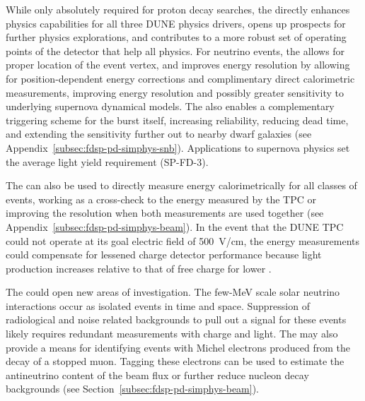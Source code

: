 While only absolutely required for proton decay searches, the  directly enhances physics capabilities for all three DUNE physics drivers, opens up prospects for further physics explorations, and contributes to a more robust set of operating points of the detector that help all physics.   For  neutrino events, the  allows for proper location of the event vertex, and improves energy resolution by allowing for position-dependent energy corrections and complimentary direct calorimetric measurements, 
improving energy resolution and possibly greater sensitivity to underlying supernova dynamical models.  The  also enables a complementary triggering scheme for the burst itself, increasing 
reliability, reducing dead time, and extending the sensitivity further out to nearby dwarf galaxies (see Appendix~\ref{subsec:fdsp-pd-simphys-snb}). Applications to supernova physics set the average light yield requirement (SP-FD-3).


The  can also be used to directly measure energy calorimetrically for all classes of events, working as a cross-check to the energy measured by the TPC or improving the resolution when both measurements are used together (see Appendix~\ref{subsec:fdsp-pd-simphys-beam}).  In the event that the DUNE TPC could not operate at its goal electric field of \SI{500}{V/cm}, the  energy measurements could compensate for lessened charge detector performance because light production increases relative to that of free charge for lower \efield{}.

The  could open new areas of investigation.  The few-MeV scale solar neutrino interactions occur as isolated events in time and space.  Suppression of radiological and noise related backgrounds to pull out a signal for these events likely requires  redundant measurements with charge and light.  The  may also provide a means for identifying events with Michel electrons produced from the decay of a stopped muon. Tagging these electrons can be used to estimate the antineutrino content of the beam flux or further reduce nucleon decay backgrounds (see Section~\ref{subsec:fdsp-pd-simphys-beam}).
 
